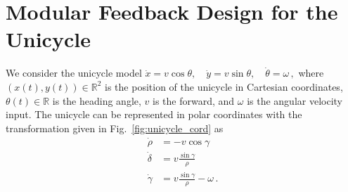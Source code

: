 \documentclass[letterpaper, 10 pt, conference]{ieeeconf}  %
\newcommand{\R}{\mathbb{R}}
\begin{document}
\section{Modular Feedback Design for the Unicycle}
We consider the unicycle model 
$\dot{x} =  v \cos\theta, \quad 
\dot{y} = v \sin\theta,
\quad \dot{\theta} = \omega \,,$
where $(x(t),y(t)) \in \R^2$ is the position of the unicycle in Cartesian coordinates, $\theta(t) \in \mathbb{R}$ is the heading angle, $v$ is the forward, and $\omega$ is the angular velocity input. The unicycle can be represented in polar coordinates with the transformation given in Fig.~\ref{fig:unicycle_cord} as
\begin{subequations}\label{eq:unicycle_polar_closed_loop-Gv-1}
    \begin{align}
    \dot{\rho} &= 
    -v \cos\gamma\label{eq:unicycle_polar_rhodot}\\
    \dot{\delta} &= v  \frac{\sin\gamma}{\rho}\label{eq:unicycle_polar_deltadot}\\
    \dot{\gamma} &= v \frac{\sin\gamma}{\rho} -\omega \label{eq:unicycle_polar_gammadot} \,.
    \end{align} 
\end{subequations}
\end{document}
